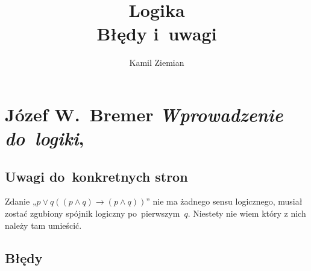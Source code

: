 \documentclass[a4paper,11pt]{article}
\title{Logika \\
  {\Large Błędy i~uwagi}}
\author{Kamil Ziemian}
\numberwithin{equation}{section}
\begin{document}





\maketitle





\section{Józef W.~Bremer \textit{Wprowadzenie do~logiki},
  \cite{Bremer-Wprowadzenie-do-logiki-Pub-2004}}


\subsection{Uwagi do~konkretnych stron}


\noindent
{} Zdanie „$p \vee q ( ( p \land q ) \to ( p \land q ) )$” nie ma
żadnego sensu logicznego, musiał zostać zgubiony spójnik logiczny
po~pierwszym~$q$. Niestety nie wiem który z nich należy tam umieścić.





\subsection{Błędy}
\end{document}
